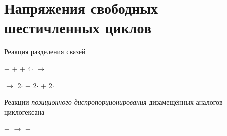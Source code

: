 \section{Напряжения свободных шестичленных циклов}

Реакция разделения связей

\begin{center}
   +  +  + 4\(\cdot\)  \(\longrightarrow\)
  
  \(\longrightarrow\) 
    2\(\cdot\) +     2\(\cdot\) + 2\(\cdot\)
\end{center}

Реакции \emph{позиционного диспропорционирования} дизамещённых аналогов циклогексана

\begin{center}
   +  \(\longrightarrow\)  + 
\end{center}
  
